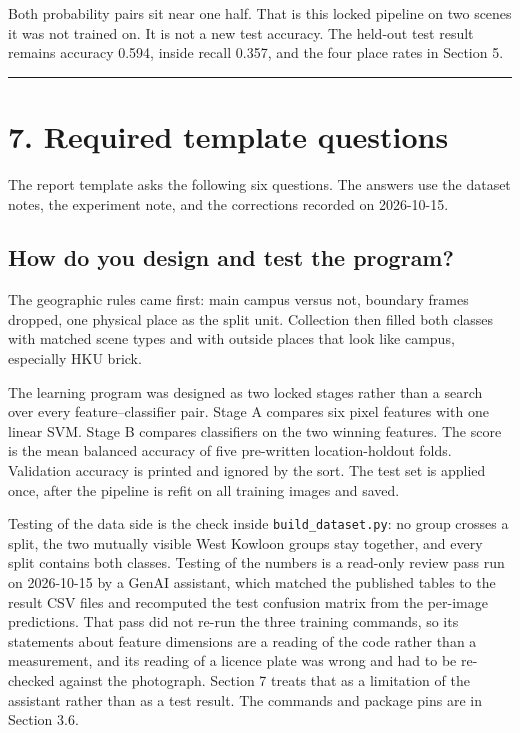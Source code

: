 \documentclass[11pt,a4paper]{article}
\begin{document}
Both probability pairs sit near one half. That is this locked pipeline on two scenes it was not trained on. It is not a new test accuracy. The held-out test result remains accuracy 0.594, inside recall 0.357, and the four place rates in Section 5.

\begin{center}\rule{0.5\linewidth}{0.5pt}\end{center}

\section{7. Required template questions}\label{required-template-questions}

The report template asks the following six questions. The answers use the dataset notes, the experiment note, and the corrections recorded on 2026-10-15.

\subsection{How do you design and test the program?}\label{how-do-you-design-and-test-the-program}

The geographic rules came first: main campus versus not, boundary frames dropped, one physical place as the split unit. Collection then filled both classes with matched scene types and with outside places that look like campus, especially HKU brick.

The learning program was designed as two locked stages rather than a search over every feature--classifier pair. Stage A compares six pixel features with one linear SVM. Stage B compares classifiers on the two winning features. The score is the mean balanced accuracy of five pre-written location-holdout folds. Validation accuracy is printed and ignored by the sort. The test set is applied once, after the pipeline is refit on all training images and saved.

Testing of the data side is the check inside \texttt{build\_\allowbreak{}dataset.py}: no group crosses a split, the two mutually visible West Kowloon groups stay together, and every split contains both classes. Testing of the numbers is a read-only review pass run on 2026-10-15 by a GenAI assistant, which matched the published tables to the result CSV files and recomputed the test confusion matrix from the per-image predictions. That pass did not re-run the three training commands, so its statements about feature dimensions are a reading of the code rather than a measurement, and its reading of a licence plate was wrong and had to be re-checked against the photograph. Section 7 treats that as a limitation of the assistant rather than as a test result. The commands and package pins are in Section 3.6.
\end{document}
